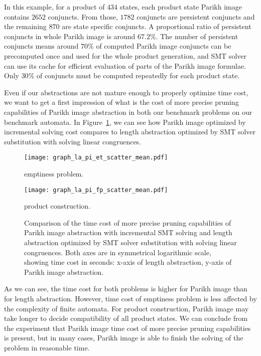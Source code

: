 In this example, for a product of $434$ states, each product state Parikh image contains $2652$ conjuncts. From those, $1782$ conjuncts are persistent conjuncts and the remaining $870$ are state specific conjuncts. A proportional ratio of persistent conjuncts in whole Parikh image is around $67.2 \%$. The number of persistent conjuncts means around $70\%$ of computed Parikh image conjuncts can be precomputed once and used for the whole product generation, and SMT solver can use its cache for efficient evaluation of parts of the Parikh image formulae. Only $30\%$ of conjuncts must be computed repeatedly for each product state.

Even if our abstractions are not mature enough to properly optimize time cost, we want to get a first impression of what is the cost of more precise pruning capabilities of Parikh image abstraction in both our benchmark problems on our benchmark automata. In Figure~\ref{fig:graph:la_pi_time_cost_comp}, we can see how Parikh image optimized by incremental solving cost compares to length abstraction optimized by SMT solver substitution with solving linear congruences.
\begin{figure}[ht]
    \centering
    \begin{minipage}{0.49\linewidth}
        \centering
        \texttt{[image: graph\_la\_pi\_et\_scatter\_mean.pdf]}
        \caption{emptiness problem.}
        \label{fig:graph:et_pi_la_comp_time_difference}
    \end{minipage}
    \hfill
    \begin{minipage}{0.49\linewidth}
        \centering
        \texttt{[image: graph\_la\_pi\_fp\_scatter\_mean.pdf]}
        \caption{product construction.}
        \label{fig:graph:fp_pi_la_comp_time_difference}
    \end{minipage}
    \vspace{0.5cm}
    \caption{Comparison of the time cost of more precise pruning capabilities of Parikh image abstraction with incremental SMT solving and length abstraction optimized by SMT solver substitution with solving linear congruences. Both axes are in symmetrical logarithmic scale, showing time cost in seconds: x-axis of length abstraction, y-axis of Parikh image abstraction.}
    \label{fig:graph:la_pi_time_cost_comp}
\end{figure}

As we can see, the time cost for both problems is higher for Parikh image than for length abstraction. However, time cost of emptiness problem is less affected by the complexity of finite automata. For product construction, Parikh image may take longer to decide compatibility of all product states. We can conclude from the experiment that Parikh image time cost of more precise pruning capabilities is present, but in many cases, Parikh image is able to finish the solving of the problem in reasonable time.


